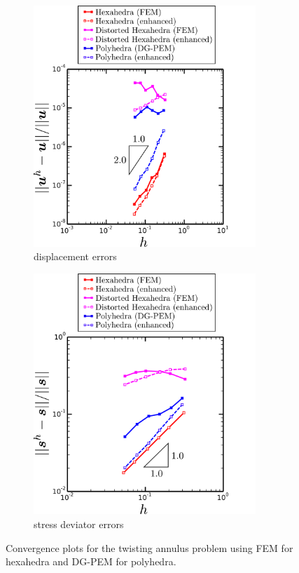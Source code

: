 \begin{figure}[!h]
  \centering
    \begin{subfigure}[b]{0.49\linewidth}
            \centering
            \includegraphics[width=3.3in]{figures/twisting_annulus_l2_errors.pdf}
    			\caption{displacement errors \label{fig:twisting_annulus_l2_errors}}
    \end{subfigure}
	\begin{subfigure}[b]{0.49\linewidth}
            \centering
            \includegraphics[width=3.3in]{figures/twisting_annulus_h1_errors.pdf}
    			\caption{stress deviator errors \label{fig:twisting_annulus_h1_errors}}
    \end{subfigure} \caption{Convergence plots for the twisting annulus problem using FEM for hexahedra and DG-PEM for polyhedra.}
  \label{fig:twisting_annulus_errors}
\end{figure}

